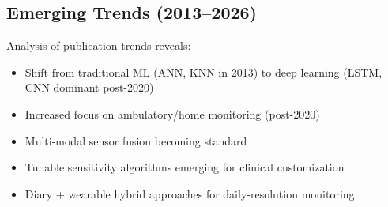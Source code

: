 \subsection{Emerging Trends (2013--2026)}

Analysis of publication trends reveals:
\begin{itemize}
\item Shift from traditional ML (ANN, KNN in 2013) to deep learning (LSTM, CNN dominant post-2020)
\item Increased focus on ambulatory/home monitoring (post-2020)
\item Multi-modal sensor fusion becoming standard
\item Tunable sensitivity algorithms emerging for clinical customization \parencite{spahr2025}
\item Diary + wearable hybrid approaches for daily-resolution monitoring \parencite{vieluf2025}
\end{itemize}
